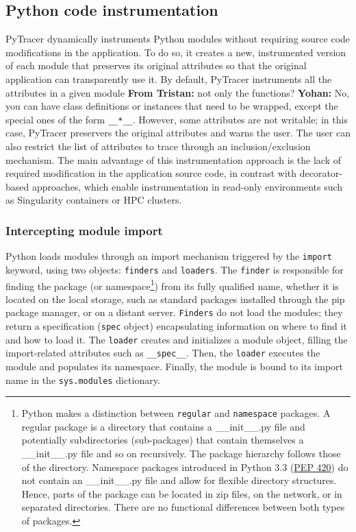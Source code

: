 \documentclass[11pt]{article}
\newcommand{\tristan}[1]{\color{orange}\textbf{From Tristan:} #1\color{black}\xspace}
\newcommand{\Yohan}[1]{\color{green!75!black}\textbf{Yohan:} #1\color{black}\xspace}
\newcommand{\pytracer}[0]{PyTracer\xspace}
\begin{document}
\subsection{Python code instrumentation}



\pytracer dynamically instruments Python modules
without requiring source code modifications in the application.
To do so, it creates a new, instrumented version of each module that preserves its original attributes so that the original application can transparently use it.
By default, \pytracer instruments all the attributes
in a given module \tristan{not only the functions?} \Yohan{No, you can have class definitions or instances that need to be wrapped}, except the special ones of the form \texttt{\_\_*\_\_}.
However, some attributes are not writable; in this case, \pytracer preservers the original attributes and warns the user. The user can also restrict the list of attributes to trace through
an inclusion/exclusion mechanism. The main advantage of this instrumentation approach is the lack of required modification in the application source code, in contrast with decorator-based approaches, which enable instrumentation in read-only environments such as Singularity containers or HPC clusters.


\subsubsection{Intercepting module import}

Python loads modules through an import mechanism triggered by the \texttt{import} keyword, using two objects: \texttt{finders} and \texttt{loaders}.
The \texttt{finder} is responsible for finding the package (or 
namespace\footnote{Python makes a distinction between \texttt{regular} and \texttt{namespace} packages.
A regular package is a directory that contains a \_\_init\_\_.py file and potentially subdirectories (sub-packages) 
that contain themselves a \_\_init\_\_.py file and so on recursively. 
The package hierarchy follows those of the directory. 
Namespace packages introduced in Python 3.3 (\href{https://www.python.org/dev/peps/pep-0420/}{PEP 420}) do not contain an
\_\_init\_\_.py file and allow for flexible directory structures. Hence, parts of the package can be located in zip files, on the network, or in separated directories. There are no functional differences between both types of packages.}) from its fully qualified name, whether it is located on the local storage, such as standard packages installed through the pip package manager, or on a distant server.
\texttt{Finders} do not load the modules; they return a specification (\texttt{spec} object) encapsulating 
information on where to find it and how to load it.
The \texttt{loader} creates and initializes a module object, filling the import-related attributes 
such as \texttt{\_\_spec\_\_}. 
Then, the \texttt{loader} executes the module and populates its namespace. Finally, the module is bound to its import name in the \texttt{sys.modules} dictionary.
\end{document}
